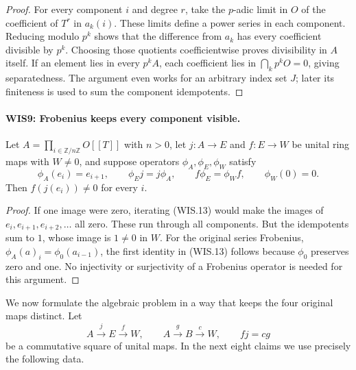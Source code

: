 \begin{proof}
For every component $i$ and degree $r$, take the $p$-adic
limit in $O$ of the coefficient of $T^r$ in $a_k(i)$.
These limits define a power series in each component.
Reducing modulo $p^k$ shows that the difference from $a_k$
has every coefficient divisible by $p^k$. Choosing those
quotients coefficientwise proves divisibility in $A$ itself.
If an element lies in every $p^kA$, each coefficient lies
in $\bigcap_kp^kO=0$, giving separatedness. The argument
even works for an arbitrary index set $J$; later its
finiteness is used to sum the component idempotents.
\end{proof}

\paragraph{WIS9: Frobenius keeps every component visible.}
\label{claim:WIS9}
Let $A=\prod_{i\in\mathbb Z/n\mathbb Z}O[[T]]$ with $n>0$,
let $j:A\to E$ and $f:E\to W$ be unital ring maps with
$W\ne0$, and suppose operators $\phi_A,\phi_E,\phi_W$ satisfy
\[
 \phi_A(e_i)=e_{i+1},\qquad
 \phi_Ej=j\phi_A,\qquad f\phi_E=\phi_Wf,\qquad \phi_W(0)=0.
                                                               \tag{WIS.13}
\]
Then $f(j(e_i))\ne0$ for every $i$.

\begin{proof}
If one image were zero, iterating (WIS.13) would make
the images of $e_i,e_{i+1},e_{i+2},\ldots$ all zero.
These run through all components. But the idempotents sum
to $1$, whose image is $1\ne0$ in $W$.
For the original series Frobenius,
$\phi_A(a)_i=\phi_0(a_{i-1})$, the first identity in
(WIS.13) follows because $\phi_0$ preserves zero and one.
No injectivity or surjectivity of a Frobenius operator
is needed for this argument.
\end{proof}

We now formulate the algebraic problem in a way that keeps
the four original maps distinct. Let
\[
 A\xrightarrow{j}E\xrightarrow{f}W,\qquad
 A\xrightarrow{g}B\xrightarrow{c}W,\qquad fj=cg              \tag{WIS.14}
\]
be a commutative square of unital maps. In the next eight claims
we use precisely the following data.

